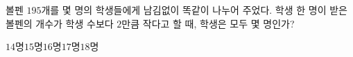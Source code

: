 볼펜 $195$개를 몇 명의 학생들에게 남김없이 똑같이 나누어 주었다. 학생 한 명이 받은 볼펜의 개수가 학생 수보다 $2$만큼 작다고 할 때, 학생은 모두 몇 명인가?
\begin{choices32}{$14$명}{$15$명}{$16$명}{$17$명}{$18$명}\end{choices32}
